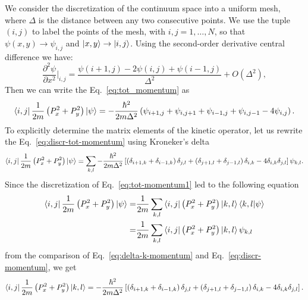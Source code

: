 We consider the discretization of the continuum space into a uniform mesh, where $\Delta$ is the distance between any two consecutive points. We use the tuple $(i,j)$ to label the points of the mesh, with $i,j = 1,\ldots , N$, so that $\psi(x,y) \rightarrow \psi_{i,j}$ and $\ket{x,y} \rightarrow \ket{i,j}$. Using the second-order derivative central difference we have:
\begin{equation}
\frac{\partial^2 \psi}{\partial x^2} \bigg|_{i,j} = \frac{\psi(i+1,j) - 2 \psi(i,j) + \psi(i-1,j)}{\Delta^2} + O(\Delta^2),
\end{equation}
Then we can write the Eq.~\eqref{eq:tot_momentum} as
\begin{equation} \label{eq:discr-tot-momentum}
\bra{i,j} \frac{1}{2m} \left( P_x^2 + P_y^2 \right) \ket{\psi} = -\frac{\hbar^2}{2m\Delta^2} \left( \psi_{i+1,j} + \psi_{i,j+1} + \psi_{i-1,j} + \psi_{i,j-1} - 4 \psi_{i,j} \right).
\end{equation}
To explicitly determine the matrix elements of the kinetic operator, let us rewrite the Eq.~\eqref{eq:discr-tot-momentum} using Kroneker's delta
\begin{equation} \label{eq:delta-k-momentum}
\bra{i,j} \frac{1}{2m} \left( P_x^2 + P_y^2 \right) \ket{\psi} = \sum_{k,l} -\frac{\hbar^2}{2m\Delta^2} \left[ \left( \delta_{i+1,k} + \delta_{i-1,k} \right) \delta_{j,l} + \left( \delta_{j+1,l} + \delta_{j-1,l} \right) \delta_{i,k} - 4 \delta_{i,k} \delta_{j,l} \right] \psi_{k,l}.
\end{equation}
Since the discretization of Eq.~\eqref{eq:tot-momentum1} led to the following equation
\begin{subequations}
\begin{align}
\bra{i,j} \frac{1}{2m} \left( P_x^2 + P_y^2 \right) \ket{\psi} = & \frac{1}{2m} \sum_{k,l} \bra{i,j} \left( P_x^2 + P_y^2 \right) \ket{k,l} \braket{k,l|\psi} \\
= & \frac{1}{2m} \sum_{k,l} \bra{i,j} \left( P_x^2 + P_y^2 \right) \ket{k,l} \psi_{k,l} \label{eq:discr-momentum}
\end{align}
\end{subequations}
from the comparison of Eq.~\eqref{eq:delta-k-momentum} and Eq.~\eqref{eq:discr-momentum}, we get
\begin{equation} \label{eq:delta-kroneker}
\bra{i,j} \frac{1}{2m} \left( P_x^2 + P_y^2 \right) \ket{k,l} = -\frac{\hbar^2}{2m\Delta^2} \left[ \left( \delta_{i+1,k} + \delta_{i-1,k} \right) \delta_{j,l} + \left( \delta_{j+1,l} + \delta_{j-1,l} \right) \delta_{i,k} - 4 \delta_{i,k} \delta_{j,l} \right].
\end{equation}

